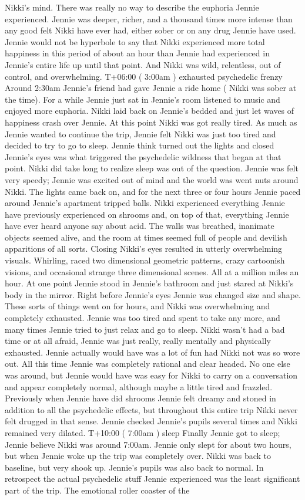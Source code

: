 \documentclass[12pt]{book}
\begin{document}
Nikki's mind. There was really no way to describe the euphoria Jennie experienced. Jennie was deeper, richer, and a thousand times more intense than any good felt Nikki have ever had, either sober or on any drug Jennie have used. Jennie would not be hyperbole to say that Nikki experienced more total happiness in this period of about an hour than Jennie had experienced in Jennie's entire life up until that point. And Nikki was wild, relentless, out of control, and overwhelming. T+06:00 ( 3:00am ) exhausted psychedelic frenzy Around 2:30am Jennie's friend had gave Jennie a ride home ( Nikki was sober at the time). For a while Jennie just sat in Jennie's room listened to music and enjoyed more euphoria. Nikki laid back on Jennie's bedded and just let waves of happiness crash over Jennie. At this point Nikki was got really tired. As much as Jennie wanted to continue the trip, Jennie felt Nikki was just too tired and decided to try to go to sleep. Jennie think turned out the lights and closed Jennie's eyes was what triggered the psychedelic wildness that began at that point. Nikki did take long to realize sleep was out of the question. Jennie was felt very speedy; Jennie was excited out of mind and the world was went nuts around Nikki. The lights came back on, and for the next three or four hours Jennie paced around Jennie's apartment tripped balls. Nikki experienced everything Jennie have previously experienced on shrooms and, on top of that, everything Jennie have ever heard anyone say about acid. The walls was breathed, inanimate objects seemed alive, and the room at times seemed full of people and devilish apparitions of all sorts. Closing Nikki's eyes resulted in utterly overwhelming visuals. Whirling, raced two dimensional geometric patterns, crazy cartoonish visions, and occasional strange three dimensional scenes. All at a million miles an hour. At one point Jennie stood in Jennie's bathroom and just stared at Nikki's body in the mirror. Right before Jennie's eyes Jennie was changed size and shape. These sorts of things went on for hours, and Nikki was overwhelming and completely exhausted. Jennie was too tired and spent to take any more, and many times Jennie tried to just relax and go to sleep. Nikki wasn't had a bad time or at all afraid, Jennie was just really, really mentally and physically exhausted. Jennie actually would have was a lot of fun had Nikki not was so wore out. All this time Jennie was completely rational and clear headed. No one else was around, but Jennie would have was easy for Nikki to carry on a conversation and appear completely normal, although maybe a little tired and frazzled. Previously when Jennie have did shrooms Jennie felt dreamy and stoned in addition to all the psychedelic effects, but throughout this entire trip Nikki never felt drugged in that sense. Jennie checked Jennie's pupils several times and Nikki remained very dilated. T+10:00 ( 7:00am ) sleep Finally Jennie got to sleep; Jennie believe Nikki was around 7:00am. Jennie only slept for about two hours, but when Jennie woke up the trip was completely over. Nikki was back to baseline, but very shook up. Jennie's pupils was also back to normal. In retrospect the actual psychedelic stuff Jennie experienced was the least significant part of the trip. The emotional roller coaster of the 
\end{document}
